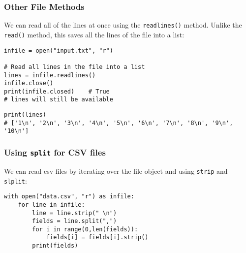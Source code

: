 \documentclass[xcolor=svgnames]{beamer}
\newenvironment{FVerbatim}
 {\VerbatimEnvironment
  \begin{center}
  \begin{lrbox}{\FVerbBox}
  \begin{BVerbatim}}
 {\end{BVerbatim}
  \end{lrbox}
  \fbox{\usebox{\FVerbBox}}
  \end{center}}
\newcommand{\purple}[1]{{\textcolor{purple}{#1}}}
\newcommand{\nl}{\\[1em]}
\newcommand{\ft}[1]{\frametitle{#1}}
\begin{document}
\begin{frame}[fragile]\ft{Other File Methods}
We can read all of the lines at once using the {\tt readlines()} method.  Unlike the  {\tt read()} method, this saves all the lines of the file into a list:
\begin{Verbatim}[xleftmargin=.5in, frame=single]
infile = open("input.txt", "r")

# Read all lines in the file into a list
lines = infile.readlines()
infile.close()
print(infile.closed)	# True
# lines will still be available
\end{Verbatim}
\begin{Verbatim}[frame=single, fontsize=\small]
print(lines)
# ['1\n', '2\n', '3\n', '4\n', '5\n', '6\n', '7\n', '8\n', '9\n', '10\n']
\end{Verbatim}

\end{frame}




\begin{frame}[fragile]\ft{Using {\tt split} for CSV files}
We can read csv files by iterating over the file object and using {\tt strip} and {\tt slplit}:\nl
\begin{Verbatim}[xleftmargin=.5in, frame=single]
with open("data.csv", "r") as infile:
    for line in infile:
        line = line.strip(" \n")
        fields = line.split(",")
        for i in range(0,len(fields)):
            fields[i] = fields[i].strip()
        print(fields)
\end{Verbatim}
\end{frame}

\end{document}
